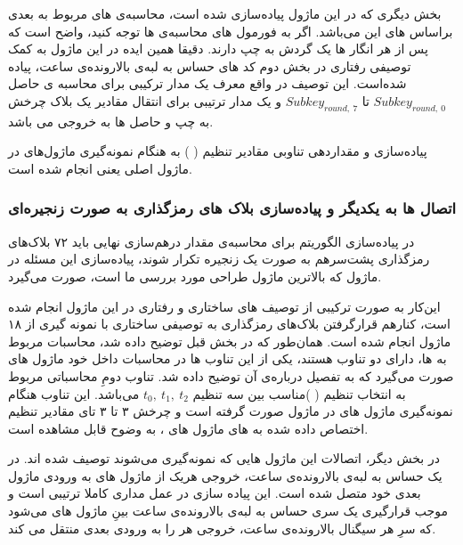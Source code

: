بخش دیگری که در این ماژول پیاده‌سازی شده است، محاسبه‌ی 
های مربوط به
 بعدی براساس 
 های این 
  می‌باشد.
  اگر به فورمول های محاسبه‌ی
  ها توجه کنید، واضح است که پس از هر 
   انگار  
   ها یک گردش به چپ دارند. دقیقا همین ایده در این ماژول به کمک توصیفی رفتاری در بخش دوم کد های 
   حساس به لبه‌ی بالارونده‌ی ساعت، پیاده شده‌است. این توصیف در واقع معرف یک مدار ترکیبی برای محاسبه ی حاصل 
   $Subkey_{round,\ 0}$
   تا
$Subkey_{round,\ 7}$
و یک مدار ترتیبی برای انتقال مقادیر یک بلاک چرخش به چپ و حاصل 
ها به خروجی می باشد.

پیاده‌سازی و مقدار‌دهی تناوبی مقادیر تنظیم (
)
به هنگام نمونه‌گیری ماژول‌های 
در ماژول اصلی یعنی
انجام شده است.

\subsubsection{
	اتصال 
	ها به یکدیگر و پیاده‌سازی بلاک های رمزگذاری به صورت زنجیره‌ای
}
در پیاده‌سازی الگوریتم
برای محاسبه‌ی مقدار درهم‌سازی نهایی باید ۷۲ 
بلاک‌های رمزگذاری پشت‌سر‌هم به صورت یک زنجیره تکرار شوند، پیاده‌سازی این مسئله در ماژول 
که بالاترین ماژول طراحی مورد بررسی ما است، صورت می‌گیرد.

این‌کار به صورت ترکیبی از توصیف های ساختاری و رفتاری در این ماژول انجام شده است،
کنارهم قرارگرفتن بلاک‌های رمزگذاری به توصیفی ساختاری با نمونه گیری از ۱۸ ماژول 
انجام شده است. همان‌طور که در بخش قبل توضیح داده شد، محاسبات مربوط به 
ها، دارای دو تناوب هستند، یکی از این تناوب ها در محاسبات داخل خود ماژول های 
صورت می‌گیرد که به تفصیل درباره‌ی آن توضیح داده شد. تناوب دومِ محاسباتی مربوط به انتخاب تنظیم (
)مناسب بین سه تنظیم
$t_0,\ t_1,\ t_2$ 
می‌باشد. این تناوب هنگام نمونه‌گیری ماژول های
در ماژول
صورت گرفته است و چرخش ۳ تا ۳ تای مقادیر تنظیم اختصاص داده شده به 
های ماژول های 
، به وضوح قابل مشاهده است.

در بخش دیگر، اتصالات این ماژول هایی که نمونه‌گیری می‌شوند توصیف شده اند. در یک 
   حساس به لبه‌ی بالا‌رونده‌ی ساعت، خروجی هر‌یک از ماژول های
   به ورودی ماژول
     بعدی خود متصل شده است. این پیاده سازی در عمل مداری کاملا ترتیبی است و موجب قرار‌گیری یک سری 
     حساس به لبه‌ی بالا‌رونده‌ی ساعت بینِ ماژول های  
      می‌شود که سرِ هر سیگنال بالا‌رونده‌ی ساعت، خروجی هر 
           را
           به ورودی 
                بعدی منتقل می کند.
                
